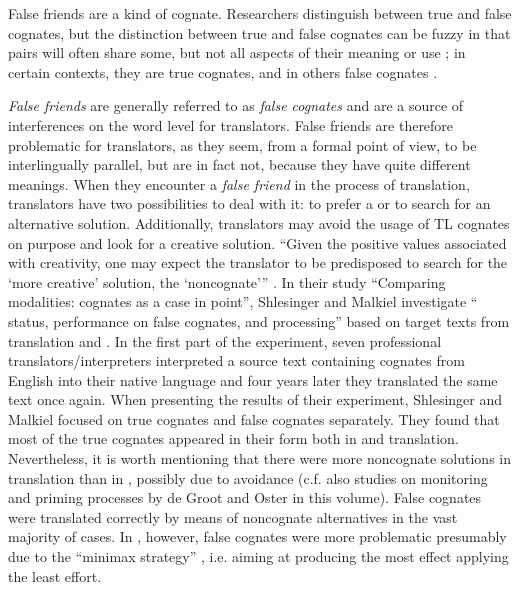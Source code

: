 \documentclass[output=paper]{langsci/langscibook.cls}
\begin{document}
False friends are a kind of cognate. Researchers distinguish between true and false cognates, but the distinction between true and false cognates can be fuzzy \citep{Taylor1976, Browne1982} in that  pairs will often share some, but not all aspects of their meaning or use \citep{Perkins1985}; in certain contexts, they are true cognates, and in others false cognates \citep[174]{Shlesinger2005}.

\textit{False friends} are generally referred to as \textit{false cognates} and are a source of interferences on the word level for translators. False friends are therefore problematic for translators, as they seem, from a formal point of view, to be interlingually parallel, but are in fact not, because they have quite different meanings. When they encounter a \textit{false friend} in the process of translation, translators have two possibilities to deal with it: to prefer a   or to search for an alternative solution. Additionally, translators may avoid the usage of TL cognates on purpose and look for a creative solution. ``Given the positive values associated with creativity, one may expect the translator to be predisposed to search for the `more creative' solution, the `noncognate'{}'' \citep[176]{Shlesinger2005}. In their study ``Comparing modalities: cognates as a case in point'', Shlesinger and Malkiel investigate `` status, performance on false cognates, and  processing'' based on target texts from translation and  \citep[176]{Shlesinger2005}. In the first part of the experiment, seven professional translators/interpreters interpreted a source text containing cognates from English into their native language and four years later they translated the same text once again. When presenting the results of their experiment, Shlesinger and Malkiel focused on true cognates and false cognates separately. They found that most of the true cognates appeared in their  form both in  and translation. Nevertheless, it is worth mentioning that there were more noncognate solutions in translation than in , possibly due to  avoidance (c.f. also studies on monitoring and priming processes by de Groot and Oster in this volume). False cognates were translated correctly by means of noncognate alternatives in the vast majority of cases. In , however, false cognates were more problematic presumably due to the ``minimax strategy'' \citep{Levy1967}, i.e. aiming at producing the most effect applying the least effort. 
\end{document}
